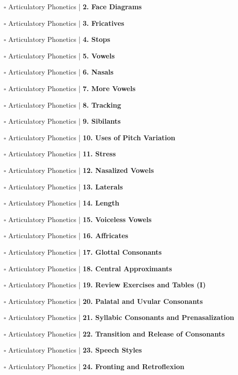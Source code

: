 \documentclass[a4, landscape, 12pt]{article}
\newcommand{\checkbox}{$\square$}%
\begin{document}
\begin{itemize}
{}
\item [\checkbox]  Articulatory Phonetics | \textbf{ 2. Face Diagrams
}
\item [\checkbox]  Articulatory Phonetics | \textbf{ 3. Fricatives
}
\item [\checkbox]  Articulatory Phonetics | \textbf{ 4. Stops
}
\item [\checkbox]  Articulatory Phonetics | \textbf{ 5. Vowels
}
\item [\checkbox]  Articulatory Phonetics | \textbf{ 6. Nasals
}
\item [\checkbox]  Articulatory Phonetics | \textbf{ 7. More Vowels
}
\item [\checkbox]  Articulatory Phonetics | \textbf{ 8. Tracking
}
\item [\checkbox]  Articulatory Phonetics | \textbf{ 9. Sibilants
}
\item [\checkbox]  Articulatory Phonetics | \textbf{ 10. Uses of Pitch Variation
}
\item [\checkbox]  Articulatory Phonetics | \textbf{ 11. Stress
}
\item [\checkbox]  Articulatory Phonetics | \textbf{ 12. Nasalized Vowels
}
\item [\checkbox]  Articulatory Phonetics | \textbf{ 13. Laterals
}
\item [\checkbox]  Articulatory Phonetics | \textbf{ 14. Length
}
\item [\checkbox]  Articulatory Phonetics | \textbf{ 15. Voiceless Vowels
}
\item [\checkbox]  Articulatory Phonetics | \textbf{ 16. Affricates
}
\item [\checkbox]  Articulatory Phonetics | \textbf{ 17. Glottal Consonants
}
\item [\checkbox]  Articulatory Phonetics | \textbf{ 18. Central Approximants
}
\item [\checkbox]  Articulatory Phonetics | \textbf{ 19. Review Exercises and Tables (I)
}
\item [\checkbox]  Articulatory Phonetics | \textbf{ 20. Palatal and Uvular Consonants
}
\item [\checkbox]  Articulatory Phonetics | \textbf{ 21. Syllabic Consonants and Prenasalization
}
\item [\checkbox]  Articulatory Phonetics | \textbf{ 22. Transition and Release of Consonants
}
\item [\checkbox]  Articulatory Phonetics | \textbf{ 23. Speech Styles
}
\item [\checkbox]  Articulatory Phonetics | \textbf{ 24. Fronting and Retroflexion
}
\end{itemize}
\end{document}
